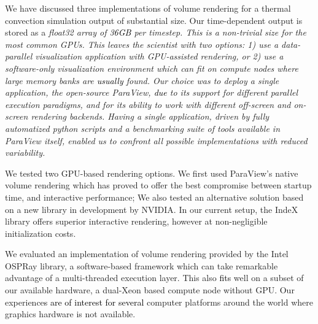 \documentclass[5p,times]{elsarticle}
\begin{document}
We have discussed three implementations of volume rendering for a thermal convection
simulation output of substantial size. Our time-dependent output is stored as a
\it{float32} \rm array of \textcolor{black}{36GB} per timestep. This is a non-trivial size for the most common
GPUs. This leaves the scientist with two options: 1) use a data-parallel visualization
application with GPU-assisted rendering, or 2) use a \it{software-only} \rm
visualization environment which can fit on compute nodes where large memory
banks are \textcolor{black}{usually} found. Our choice was to deploy a single application, the open-source
ParaView, \textcolor{black}{due} to its support for different parallel execution paradigms, and for its ability to work with different off-screen and on-screen rendering backends. Having a single application,
driven by fully automatized python scripts and a benchmarking suite of tools
available in ParaView itself, enabled us to confront all possible implementations with reduced variability.

We tested two GPU-based rendering options. We first used ParaView's native volume rendering which has proved to offer the best compromise between startup time, and interactive performance; We also tested an alternative solution based on a new library in development by NVIDIA. In our current setup, the IndeX library offers superior interactive rendering, however at non-negligible initialization costs.

We evaluated an implementation of volume rendering provided by the Intel OSPRay library,
a software-based framework which can take remarkable advantage of a multi-threaded
execution layer. This also \textcolor{black}{fits} well on a subset of our available hardware, a dual-Xeon based compute node without GPU. Our experience\textcolor{black}{s are of interest for several} computer platforms around the world where graphics hardware is not available. 
\end{document}
